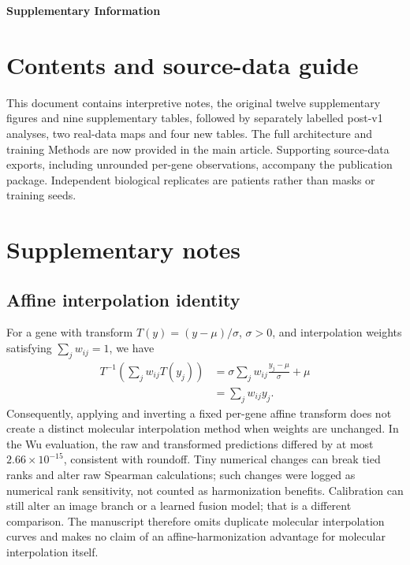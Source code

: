 
\begin{center}
{\Large\bfseries Supplementary Information\par}
\vspace{10pt}
{\large\bfseries \PaperTitle\par}
\vspace{12pt}
\AuthorNames\par
\AuthorAffiliations\par
\Correspondence\par
\end{center}
\section*{Contents and source-data guide}
This document contains interpretive notes, the original twelve supplementary figures and nine supplementary tables, followed by separately labelled post-v1 analyses, two real-data maps and four new tables. The full architecture and training Methods are now provided in the main article. Supporting source-data exports, including unrounded per-gene observations, accompany the publication package. Independent biological replicates are patients rather than masks or training seeds.
\clearpage
\section{Supplementary notes}
\subsection{Affine interpolation identity}
For a gene with transform $T(y)=(y-\mu)/\sigma$, $\sigma>0$, and interpolation weights satisfying $\sum_j w_{ij}=1$, we have
\begin{align*}
T^{-1}\!\left(\sum_j w_{ij}T(y_j)\right)
&=\sigma\sum_jw_{ij}\frac{y_j-\mu}{\sigma}+\mu\\
&=\sum_j w_{ij}y_j.
\end{align*}
Consequently, applying and inverting a fixed per-gene affine transform does not create a distinct molecular interpolation method when weights are unchanged. In the Wu evaluation, the raw and transformed predictions differed by at most $2.66\times10^{-15}$, consistent with roundoff. Tiny numerical changes can break tied ranks and alter raw Spearman calculations; such changes were logged as numerical rank sensitivity, not counted as harmonization benefits. Calibration can still alter an image branch or a learned fusion model; that is a different comparison. The manuscript therefore omits duplicate molecular interpolation curves and makes no claim of an affine-harmonization advantage for molecular interpolation itself.

